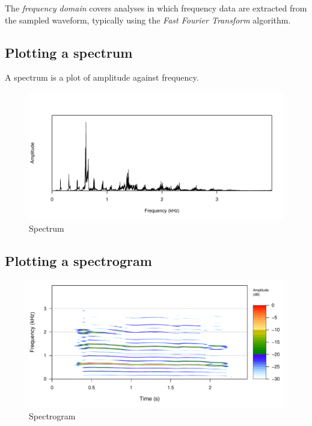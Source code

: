 \documentclass[
]{book}
\begin{document}
The \emph{frequency domain} covers analyses in which frequency data are extracted from the sampled waveform, typically using the \emph{Fast Fourier Transform} algorithm.

\hypertarget{plotting-a-spectrum}{%
\subsection{Plotting a spectrum}\label{plotting-a-spectrum}}

A spectrum is a plot of amplitude against frequency.

\begin{figure}

{\centering \includegraphics[width=0.9\linewidth]{_main_files/figure-latex/spectrum-1} 

}

\caption{Spectrum}\label{fig:spectrum}
\end{figure}

\hypertarget{plotting-a-spectrogram}{%
\subsection{Plotting a spectrogram}\label{plotting-a-spectrogram}}

\begin{figure}

{\centering \includegraphics[width=0.9\linewidth]{_main_files/figure-latex/spectrogram-1} 

}

\caption{Spectrogram}\label{fig:spectrogram}
\end{figure}
\end{document}

